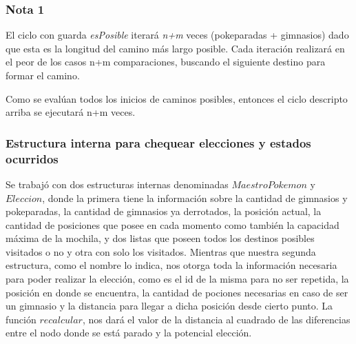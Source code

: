 \subsubsection*{Nota 1}
El ciclo con guarda \textit{esPosible} iterará \textit{n+m} veces (pokeparadas + gimnasios) dado que esta es la longitud del camino más largo posible. Cada iteración realizará en el peor de los casos n+m comparaciones, buscando el siguiente destino para formar el camino.

Como se evalúan todos los inicios de caminos posibles, entonces el ciclo descripto arriba se ejecutará n+m veces.

\subsubsection*{Estructura interna para chequear elecciones y estados ocurridos}

Se trabajó con dos estructuras internas denominadas $MaestroPokemon$ y $Eleccion$, donde la primera tiene la informaci\'on sobre la cantidad de gimnasios y pokeparadas, la cantidad de gimnasios ya derrotados, la posici\'on actual, la cantidad de posiciones que posee en cada momento como tambi\'en la capacidad m\'axima de la mochila, y dos listas que poseen todos los destinos posibles visitados o no y otra con solo los visitados.
Mientras que nuestra segunda estructura, como el nombre lo indica, nos otorga toda la informaci\'on necesaria para poder realizar la elecci\'on, como es el id de la misma para no ser repetida, la posici\'on en donde se encuentra, la cantidad de pociones necesarias en caso de ser un gimnasio y la distancia para llegar a dicha posici\'on desde cierto punto.
La funci\'on $recalcular$, nos dar\'a el valor de la distancia al cuadrado de las diferencias entre el nodo donde se está parado y la potencial elección.

